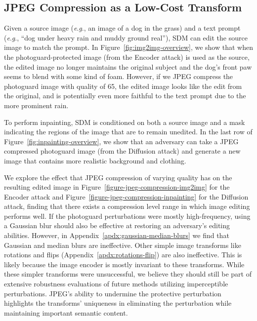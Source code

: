 \documentclass{article} %
\newcommand{\eg}{\textit{e}.\textit{g}.}
\begin{document}


\subsection{JPEG Compression as a Low-Cost Transform}
Given a source image (\eg, an image of a dog in the grass) and a text prompt (\eg, ``dog under heavy rain and muddy ground real''), SDM can edit the source image to match the prompt. In Figure~\ref{fig:img2img-overview}, we show that when the photoguard-protected image (from the Encoder attack) is used as the source, the edited image no longer maintains the original subject and the dog's front paw seems to blend with some kind of foam. However, if we JPEG compress the photoguard image with quality of 65, the edited image looks like the edit from the original, and is potentially even more faithful to the text prompt due to the more prominent rain.

To perform inpainting, SDM is conditioned on both a source image and a mask indicating the regions of the image that are to remain unedited. In the last row of Figure~\ref{fig:inpainting-overview}, we show that an adversary can take a JPEG compressed photoguard image (from the Diffusion attack) and generate a new image that contains more realistic background and clothing. 




We explore the effect that JPEG compression of varying quality has on the resulting edited image in Figure~\ref{figure-jpeg-compression-img2img} for the Encoder attack and Figure~\ref{figure-jpeg-compression-inpainting} for the Diffusion attack, finding that there exists a compression level range in which image editing performs well. If the photoguard perturbations were mostly high-frequency, using a Gaussian blur should also be effective at restoring an adversary's editing abilities. However, in Appendix~\ref{apdx:gaussian-median-blurs} we find that Gaussian and median blurs are ineffective. Other simple image transforms like rotations and flips (Appendix~\ref{apdx:rotations-flip}) are also ineffective. This is likely because the image encoder is mostly invariant to these transforms. While these simpler transforms were unsuccessful, we believe they should still be part of extensive robustness evaluations of future methods utilizing imperceptible perturbations. JPEG's ability to undermine the protective perturbation highlights the transforms' uniqueness in eliminating the perturbation while maintaining important semantic content.
\end{document}
